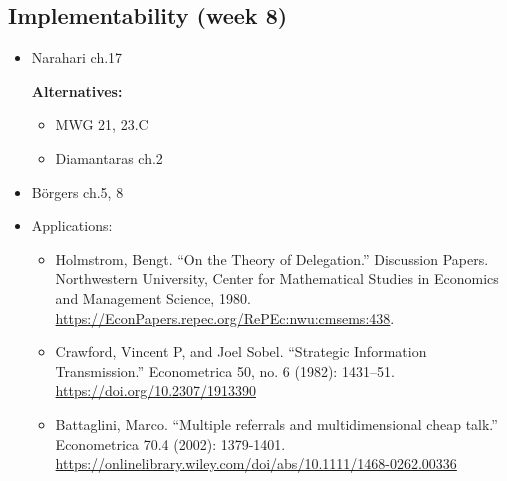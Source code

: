 \documentclass{article}
\begin{document}
\subsection{Implementability (week 8)}
\begin{itemize}
	\item Narahari ch.17
	
	\textbf{Alternatives:}
	\begin{itemize}
		\item MWG 21, 23.C
		\item Diamantaras ch.2
	\end{itemize}

	\item B{\"o}rgers ch.5, 8

	\item Applications:
	\begin{itemize}
		\item Holmstrom, Bengt. ``On the Theory of Delegation.'' Discussion Papers. Northwestern University, Center for Mathematical Studies in Economics and Management Science, 1980.\\ \url{https://EconPapers.repec.org/RePEc:nwu:cmsems:438}.
		\item Crawford, Vincent P, and Joel Sobel. ``Strategic Information Transmission.'' Econometrica 50, no. 6 (1982): 1431–51. \url{https://doi.org/10.2307/1913390}
		\item Battaglini, Marco. ``Multiple referrals and multidimensional cheap talk.'' Econometrica 70.4 (2002): 1379-1401.\\ \url{https://onlinelibrary.wiley.com/doi/abs/10.1111/1468-0262.00336}
	\end{itemize}

\end{itemize}
\end{document}
